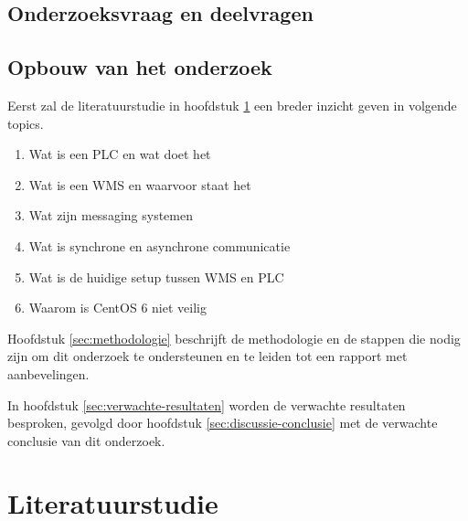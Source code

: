 \newpage

\subsection{Onderzoeksvraag en deelvragen}


\subsection{Opbouw van het onderzoek}
Eerst zal de literatuurstudie in hoofdstuk \ref{sec:literatuurstudie} een breder inzicht geven in volgende topics.
\begin{enumerate}
  \item Wat is een PLC en wat doet het
  \item Wat is een WMS en waarvoor staat het
  \item Wat zijn messaging systemen
  \item Wat is synchrone en asynchrone communicatie
  \item Wat is de huidige setup tussen WMS en PLC
  \item Waarom is CentOS 6 niet veilig
\end{enumerate}

Hoofdstuk \ref{sec:methodologie} beschrijft de methodologie en de stappen die nodig zijn om dit onderzoek te ondersteunen
en te leiden tot een rapport met aanbevelingen.
\newline

In hoofdstuk \ref{sec:verwachte-resultaten} worden de verwachte resultaten besproken, gevolgd door 
hoofdstuk \ref{sec:discussie-conclusie} met de verwachte conclusie van dit onderzoek.

\bigskip



\section{Literatuurstudie}%
\label{sec:literatuurstudie}


